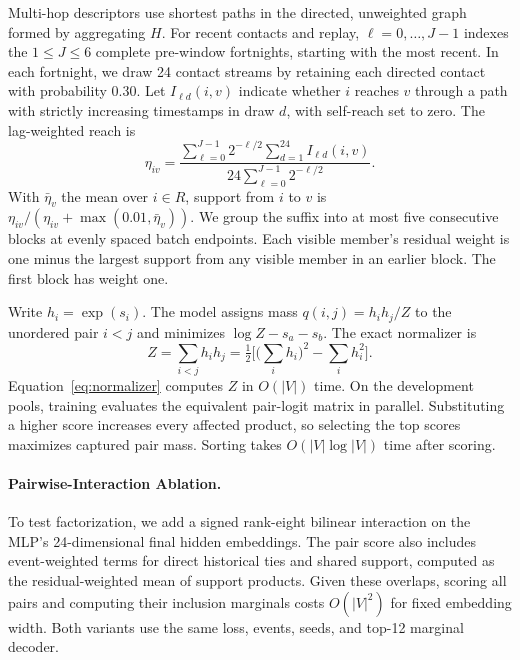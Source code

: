 \documentclass[a4paper,runningheads]{llncs}
\begin{document}
Multi-hop descriptors use shortest paths in the directed, unweighted graph formed by aggregating $H$. For recent contacts and replay, $\ell=0,\ldots,J-1$ indexes the $1\leq J\leq 6$ complete pre-window fortnights, starting with the most recent. In each fortnight, we draw 24 contact streams by retaining each directed contact with probability 0.30. Let $I_{\ell d}(i,v)$ indicate whether $i$ reaches $v$ through a path with strictly increasing timestamps in draw $d$, with self-reach set to zero. The lag-weighted reach is
\[
 \eta_{iv}=\frac{\sum_{\ell=0}^{J-1}2^{-\ell/2}\sum_{d=1}^{24} I_{\ell d}(i,v)}
                {24\sum_{\ell=0}^{J-1}2^{-\ell/2}}.
\]
With $\bar\eta_v$ the mean over $i\in R$, support from $i$ to $v$ is $\eta_{iv}/(\eta_{iv}+\max(0.01,\bar\eta_v))$. We group the suffix into at most five consecutive blocks at evenly spaced batch endpoints. Each visible member's residual weight is one minus the largest support from any visible member in an earlier block. The first block has weight one.

Write $h_i=\exp(s_i)$. The model assigns mass $q(i,j)=h_i h_j/Z$ to the unordered pair $i<j$ and minimizes $\log Z-s_a-s_b$. The exact normalizer is
\begin{equation}
 Z=\sum_{i<j}h_i h_j=\tfrac12\bigg[\bigg(\sum_i h_i\bigg)^2-\sum_i h_i^2\bigg].
 \label{eq:normalizer}
\end{equation}
Equation~\eqref{eq:normalizer} computes $Z$ in $O(|V|)$ time. On the development pools, training evaluates the equivalent pair-logit matrix in parallel. Substituting a higher score increases every affected product, so selecting the top scores maximizes captured pair mass. Sorting takes $O(|V|\log|V|)$ time after scoring.

\paragraph{Pairwise-Interaction Ablation.}
To test factorization, we add a signed rank-eight bilinear interaction on the MLP's 24-dimensional final hidden embeddings. The pair score also includes event-weighted terms for direct historical ties and shared support, computed as the residual-weighted mean of support products. Given these overlaps, scoring all pairs and computing their inclusion marginals costs $O(|V|^2)$ for fixed embedding width. Both variants use the same loss, events, seeds, and top-12 marginal decoder.
\end{document}
